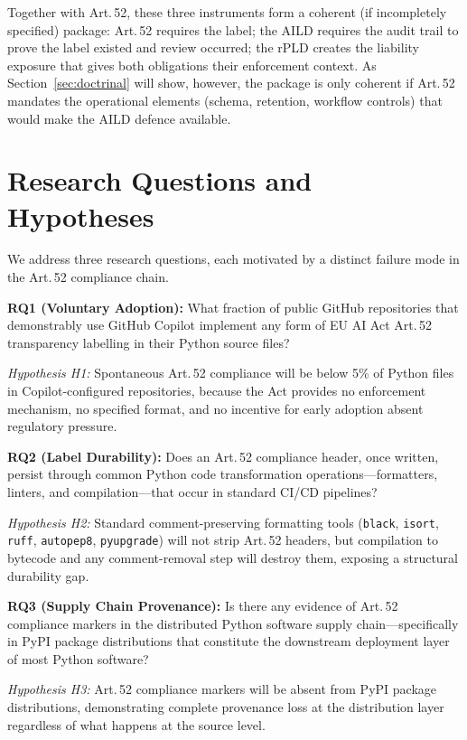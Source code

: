 \documentclass[conference]{IEEEtran}
\begin{document}
Together with Art.\,52, these three instruments form a coherent (if
incompletely specified) package: Art.\,52 requires the label; the AILD
requires the audit trail to prove the label existed and review occurred;
the rPLD creates the liability exposure that gives both obligations their
enforcement context.  As Section~\ref{sec:doctrinal} will show, however,
the package is only coherent if Art.\,52 mandates the operational
elements (schema, retention, workflow controls) that would make the AILD
defence available.

\section{Research Questions and Hypotheses}
\label{sec:rq}

We address three research questions, each motivated by a distinct failure
mode in the Art.\,52 compliance chain.

\textbf{RQ1 (Voluntary Adoption):} What fraction of public GitHub
repositories that demonstrably use GitHub Copilot implement any form of
EU AI Act Art.\,52 transparency labelling in their Python source files?

\emph{Hypothesis H1:} Spontaneous Art.\,52 compliance will be below 5\%
of Python files in Copilot-configured repositories, because the Act
provides no enforcement mechanism, no specified format, and no incentive
for early adoption absent regulatory pressure.

\textbf{RQ2 (Label Durability):} Does an Art.\,52 compliance header,
once written, persist through common Python code transformation
operations---formatters, linters, and compilation---that occur in
standard CI/CD pipelines?

\emph{Hypothesis H2:} Standard comment-preserving formatting tools
(\texttt{black}, \texttt{isort}, \texttt{ruff}, \texttt{autopep8},
\texttt{pyupgrade}) will not strip Art.\,52 headers, but compilation to
bytecode and any comment-removal step will destroy them, exposing a
structural durability gap.

\textbf{RQ3 (Supply Chain Provenance):} Is there any evidence of
Art.\,52 compliance markers in the distributed Python software supply
chain---specifically in PyPI package distributions that constitute the
downstream deployment layer of most Python software?

\emph{Hypothesis H3:} Art.\,52 compliance markers will be absent from
PyPI package distributions, demonstrating complete provenance loss at
the distribution layer regardless of what happens at the source level.
\end{document}
